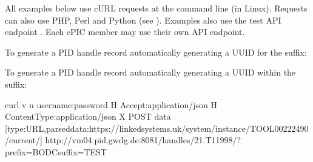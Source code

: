 \documentclass[a4paper,10pt,english]{sphinxmanual}
\begin{document}
\sphinxAtStartPar
All examples below use cURL requests at the command line (in Linux).
Requests can also use PHP, Perl and Python (see
).  Examples also use
the test API endpoint .  Each
ePIC member may use their own API end\sphinxhyphen{}point.

\sphinxAtStartPar
To generate a PID handle record automatically generating a UUID for
the suffix:

\begin{sphinxVerbatim}[commandchars=\\\{\}]
           \PYG{l+s+s1}{[}\PYG{l+s+s1}{\PYGZcb{}]} 
\end{sphinxVerbatim}

\sphinxAtStartPar
{} 

\sphinxAtStartPar
To generate a PID handle record automatically generating a UUID within
the suffix:

\begin{sphinxVerbatim}[commandchars=\\\{\}]
curl \PYGZhy{}v \PYGZhy{}u \PYGZdq{}username:password\PYGZdq{} \PYGZhy{}H \PYGZdq{}Accept:application/json\PYGZdq{} \PYGZhy{}H \PYGZdq{}Content\PYGZhy{}Type:application/json\PYGZdq{} \PYGZhy{}X POST \PYGZhy{}\PYGZhy{}data \PYGZsq{}[\PYGZob{}\PYGZdq{}type\PYGZdq{}:\PYGZdq{}URL\PYGZdq{},\PYGZdq{}parsed\PYGZus{}data\PYGZdq{}:\PYGZdq{}https://linkedsystems.uk/system/instance/TOOL0022\PYGZus{}2490/current/\PYGZdq{}\PYGZcb{}]\PYGZsq{} http://vm04.pid.gwdg.de:8081/handles/21.T11998/\PYGZbs{}?prefix=BODC\PYGZbs{}\PYGZam{}suffix=TEST
\end{sphinxVerbatim}
\end{document}
